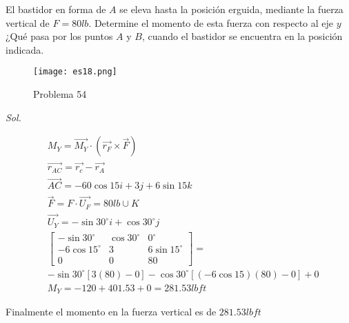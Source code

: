 \begin{problem}
El bastidor en forma de $A$ se eleva hasta la posición erguida, mediante la fuerza vertical de $F=80 lb$. Determine el momento de esta fuerza con respecto al eje $y$ ¿Qué pasa por los puntos $A$ y $B$, cuando el bastidor se encuentra en la posición indicada.
\end{problem}

\begin{figure}[h!]
	\centering
	\texttt{[image: es18.png]}
	\caption{Problema 54}
\end{figure}

\textit{ Sol.}

\begin{align*}
	 & M_Y=\vec{M_Y}\cdot(\vec{r_F}\times \vec{F})                                                                                                                                          \\
	 & \vec{r_{AC}}=\vec{r_c}-\vec{r_A}                                                                                                                                                     \\
	 & \vec{AC}=-60\cos{15}i+3j+6\sin{15}k                                                                                                                                                  \\
	 & \vec{F}=F\cdot \vec{U_F}=80lb\cup{K}                                                                                                                                                 \\
	 & \vec{U_Y}=-\sin{30^{\circ}}i+\cos{30^{\circ}}j                                                                                                                                       \\
	 & \begin{bmatrix}
		   -\sin{30^{\circ}} & \cos{30^{\circ}} & 0^{\circ} \\-6\cos{15^{\circ}}&3&6\sin{15^{\circ}}\\0&0&80
	   \end{bmatrix}= \\
	 & -\sin{30^{\circ}}[3(80)-0]-\cos{30^{\circ}}[(-6\cos{15})(80)-0]+0                                                                                                                    \\
	 & M_Y=-120+401.53+0=281.53lbft
\end{align*}

Finalmente el momento en la fuerza vertical es de $281.53 lbft$

